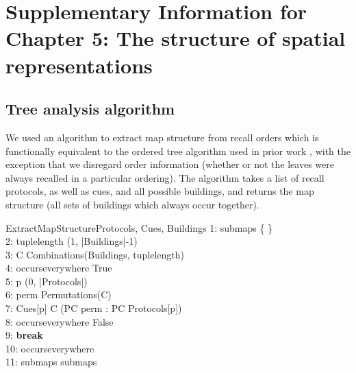 %
%

\chapter{Supplementary Information for Chapter 5: The structure of spatial representations}
\label{apx:mapstruture}

\section{Tree analysis algorithm}

We used an algorithm to extract map structure from recall orders which is functionally equivalent to the ordered tree algorithm used in prior work \citep{Hirtle_Jonides_1985, mcnamara1986mental, mcnamara1989subjective}, with the exception that we disregard order information (whether or not the leaves were always recalled in a particular ordering). The algorithm takes a list of recall protocols, as well as cues, and all possible buildings, and returns the map structure (all sets of buildings which always occur together).

\begin{pseudocode}[ruled]{ExtractMapStructure}{Protocols, Cues, Buildings}
	1: submaps \GETS \{ \} \\
	2: \FOREACH tuplelength \in (1, |Buildings|-1) \\
	3: \quad \FOREACH C \in Combinations(Buildings, tuplelength) \\
	4: \quad\quad occurseverywhere \GETS True \\
	5: \quad\quad \FOREACH p \in (0, |Protocols|) \\
	6: \quad\quad\quad perm \GETS Permutations(C) \\
	7: \quad\quad\quad \IF Cues[p] \notin C \AND \forall (PC \in perm : PC \notin Protocols[p]) \\
	8: \quad\quad\quad\quad occurseverywhere \GETS False \\
	9: \quad\quad\quad\quad \textbf{break} \\
	10: \quad\quad \IF occurseverywhere \\
	11: \quad\quad\quad submaps \GETS submaps 
\end{pseudocode}

